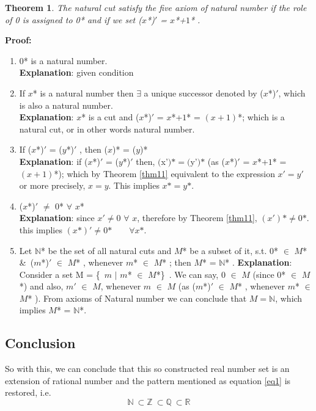 \documentclass[12pt,a4paper,final,titlepage]{article}
\newtheorem{thm}{Theorem}
\begin{document}
\begin{thm} \label{thm15}
The natural cut satisfy the five axiom of natural number if the role of 0 is assigned to 0* and if we set ($x$*)$'$ = $x$*+$1$* .
\end{thm}

\textbf{Proof:}
\begin{enumerate}
\item 0* is a natural number. \\
\textbf{Explanation}: given condition

\item If $x$* is a natural number then $\exists$ a unique successor denoted by ($x$*)$'$, which is also a natural number.\\ \textbf{Explanation}: $x$* is a cut and ($x$*)$'$ = $x$*+$1$* = $(x+1)$*; which is a natural cut, or in other words natural number.

\item If ($x$*)$'$ = ($y$*)$'$ , \quad then ($x$)* = ($y$)* \\
\textbf{Explanation}: if ($x$*)$'$ = ($y$*)$'$ then, $($x'$)\text{*} = ($y'$)\text{*}$ (as ($x$*)$'$ = $x$*+$1$* = $(x+1)$*); which by Theorem \ref{thm11} equivalent to the expression $x'=y'$ or more precisely, $x=y$. This implies $x\text{*}=y\text{*}$.

\item ($x$*)$'$ $\neq$ 0* \qquad $\forall$ $x$* \\
\textbf{Explanation}: since $x'\neq 0$ $\forall$ $x$, therefore by Theorem \ref{thm11}, $(x')\text{*} \neq 0\text{*}$. this implies $(x\text{*})' \neq 0\text{*} \qquad \forall x\text{*}$.

\item Let $\mathbb{N}$* be the set of all natural cuts and $M$* be a subset of it, s.t. 0* $\in$ $M$* \&\ ($m$*)$'$ $\in$ $M$* , whenever $m$* $\in$ $M$* ; then $M$* = $\mathbb{N}$* .
\textbf{Explanation}: Consider a set M = \{\ $m$ $\mid$ $m$* $\in$ $M$*\}\ . We can say, 0 $\in$ $M$ (since 0* $\in$ $M$*) and also, $m'$ $\in$ $M$, whenever $m$ $\in$ $M$ (as ($m$*)$'$ $\in$ $M$* , whenever $m$* $\in$ $M$* ). From axioms of Natural number we can conclude that $M=\mathbb{N}$, which implies $M$* = $\mathbb{N}$*.

\end{enumerate}


\subsection{Conclusion}
So with this, we can conclude that this so constructed real number set is an extension of rational number and the  pattern mentioned as equation \ref{eq1} is restored, i.e.
\begin{equation}
\mathbb{N}\:\subset \mathbb{Z}\:\subset \mathbb{Q}\: \subset \mathbb{R}
\end{equation}
\end{document}
